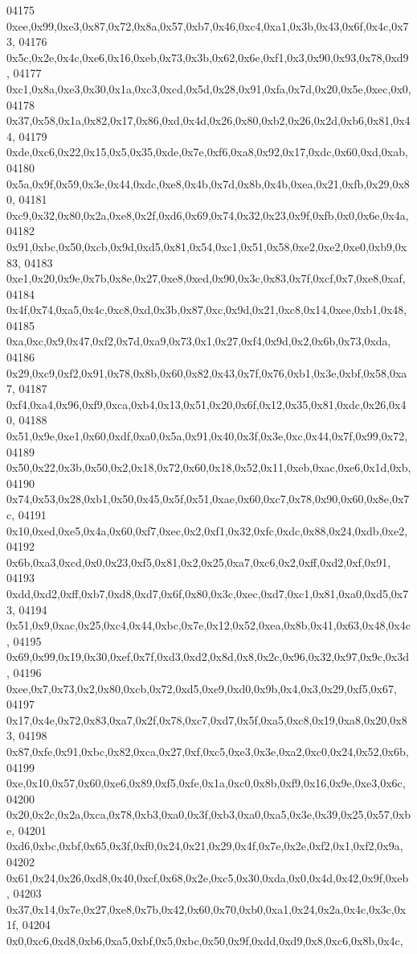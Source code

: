 \begin{DoxyCode}
04175   0xee,0x99,0xe3,0x87,0x72,0x8a,0x57,0xb7,0x46,0xc4,0xa1,0x3b,0x43,0x6f,0x4c,0x73,
04176   0x5c,0x2e,0x4c,0xe6,0x16,0xeb,0x73,0x3b,0x62,0x6e,0xf1,0x3,0x90,0x93,0x78,0xd9,
04177   0xc1,0x8a,0xe3,0x30,0x1a,0xc3,0xcd,0x5d,0x28,0x91,0xfa,0x7d,0x20,0x5e,0xec,0x0,
04178   0x37,0x58,0x1a,0x82,0x17,0x86,0xd,0x4d,0x26,0x80,0xb2,0x26,0x2d,0xb6,0x81,0x44,
04179   0xde,0xc6,0x22,0x15,0x5,0x35,0xde,0x7e,0xf6,0xa8,0x92,0x17,0xdc,0x60,0xd,0xab,
04180   0x5a,0x9f,0x59,0x3e,0x44,0xdc,0xe8,0x4b,0x7d,0x8b,0x4b,0xea,0x21,0xfb,0x29,0x80,
04181   0xc9,0x32,0x80,0x2a,0xe8,0x2f,0xd6,0x69,0x74,0x32,0x23,0x9f,0xfb,0x0,0x6e,0x4a,
04182   0x91,0xbc,0x50,0xcb,0x9d,0xd5,0x81,0x54,0xc1,0x51,0x58,0xe2,0xe2,0xe0,0xb9,0x83,
04183   0xe1,0x20,0x9e,0x7b,0x8e,0x27,0xe8,0xed,0x90,0x3c,0x83,0x7f,0xcf,0x7,0xe8,0xaf,
04184   0x4f,0x74,0xa5,0x4c,0xc8,0xd,0x3b,0x87,0xc,0x9d,0x21,0xc8,0x14,0xee,0xb1,0x48,
04185   0xa,0xc,0x9,0x47,0xf2,0x7d,0xa9,0x73,0x1,0x27,0xf4,0x9d,0x2,0x6b,0x73,0xda,
04186   0x29,0xc9,0xf2,0x91,0x78,0x8b,0x60,0x82,0x43,0x7f,0x76,0xb1,0x3e,0xbf,0x58,0xa7,
04187   0xf4,0xa4,0x96,0xf9,0xca,0xb4,0x13,0x51,0x20,0x6f,0x12,0x35,0x81,0xdc,0x26,0x40,
04188   0x51,0x9e,0xe1,0x60,0xdf,0xa0,0x5a,0x91,0x40,0x3f,0x3e,0xc,0x44,0x7f,0x99,0x72,
04189   0x50,0x22,0x3b,0x50,0x2,0x18,0x72,0x60,0x18,0x52,0x11,0xeb,0xac,0xe6,0x1d,0xb,
04190   0x74,0x53,0x28,0xb1,0x50,0x45,0x5f,0x51,0xae,0x60,0xc7,0x78,0x90,0x60,0x8e,0x7c,
04191   0x10,0xed,0xe5,0x4a,0x60,0xf7,0xec,0x2,0xf1,0x32,0xfc,0xdc,0x88,0x24,0xdb,0xe2,
04192   0x6b,0xa3,0xcd,0x0,0x23,0xf5,0x81,0x2,0x25,0xa7,0xc6,0x2,0xff,0xd2,0xf,0x91,
04193   0xdd,0xd2,0xff,0xb7,0xd8,0xd7,0x6f,0x80,0x3c,0xec,0xd7,0xc1,0x81,0xa0,0xd5,0x73,
04194   0x51,0x9,0xac,0x25,0xc4,0x44,0xbc,0x7e,0x12,0x52,0xea,0x8b,0x41,0x63,0x48,0x4c,
04195   0x69,0x99,0x19,0x30,0xef,0x7f,0xd3,0xd2,0x8d,0x8,0x2c,0x96,0x32,0x97,0x9c,0x3d,
04196   0xee,0x7,0x73,0x2,0x80,0xcb,0x72,0xd5,0xe9,0xd0,0x9b,0x4,0x3,0x29,0xf5,0x67,
04197   0x17,0x4e,0x72,0x83,0xa7,0x2f,0x78,0xc7,0xd7,0x5f,0xa5,0xc8,0x19,0xa8,0x20,0x83,
04198   0x87,0xfe,0x91,0xbc,0x82,0xca,0x27,0xf,0xc5,0xe3,0x3e,0xa2,0xc0,0x24,0x52,0x6b,
04199   0xe,0x10,0x57,0x60,0xe6,0x89,0xf5,0xfe,0x1a,0xc0,0x8b,0xf9,0x16,0x9e,0xe3,0x6c,
04200   0x20,0x2c,0x2a,0xca,0x78,0xb3,0xa0,0x3f,0xb3,0xa0,0xa5,0x3e,0x39,0x25,0x57,0xbe,
04201   0xd6,0xbc,0xbf,0x65,0x3f,0xf0,0x24,0x21,0x29,0x4f,0x7e,0x2e,0xf2,0x1,0xf2,0x9a,
04202   0x61,0x24,0x26,0xd8,0x40,0xcf,0x68,0x2e,0xc5,0x30,0xda,0x0,0x4d,0x42,0x9f,0xeb,
04203   0x37,0x14,0x7e,0x27,0xe8,0x7b,0x42,0x60,0x70,0xb0,0xa1,0x24,0x2a,0x4c,0x3c,0x1f,
04204   0x0,0xc6,0xd8,0xb6,0xa5,0xbf,0x5,0xbc,0x50,0x9f,0xdd,0xd9,0x8,0xc6,0x8b,0x4c,

\end{DoxyCode}
